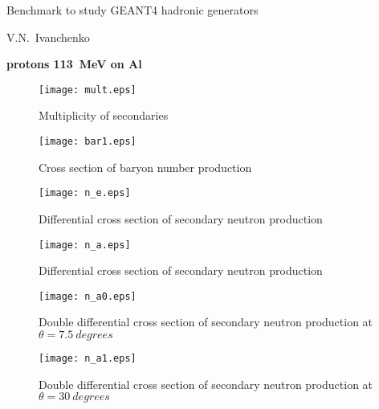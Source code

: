 \documentclass[12pt]{article}
\begin{document}
\pagestyle{empty}

\begin{center}
{\large Benchmark to study GEANT4 hadronic generators} 

\vspace*{5mm}
V.N.~Ivanchenko

\vspace*{5mm}


\vspace*{5mm}

{\bf protons 113~MeV on Al} 

\vspace*{5mm}


\end{center}

\begin{figure}[htbp]
\caption{Multiplicity of secondaries}
\label{fig1a}  
\centerline{\texttt{[image: mult.eps]}}
\end{figure}

\begin{figure}[htbp]
\caption{Cross section of baryon number production}
\label{fig1b}  
\centerline{\texttt{[image: bar1.eps]}}
\end{figure}

\begin{figure}[htbp]
\caption{Differential cross section of secondary neutron production}
\label{fig7}  
\centerline{\texttt{[image: n\_e.eps]}}
\end{figure}
\begin{figure}[htbp]
\caption{Differential cross section of secondary neutron production}
\label{fig10} 
\centerline{\texttt{[image: n\_a.eps]}}
\end{figure}

\clearpage


\begin{figure}[htbp]
\caption{Double differential cross section of secondary neutron production at $\theta = 7.5~degrees$}
\label{figa0} 
\centerline{\texttt{[image: n\_a0.eps]}}
\end{figure}


\begin{figure}[htbp]
\caption{Double differential cross section of secondary neutron production at $\theta = 30~degrees$}
\label{figa1} 
\centerline{\texttt{[image: n\_a1.eps]}}
\end{figure}
\end{document}

